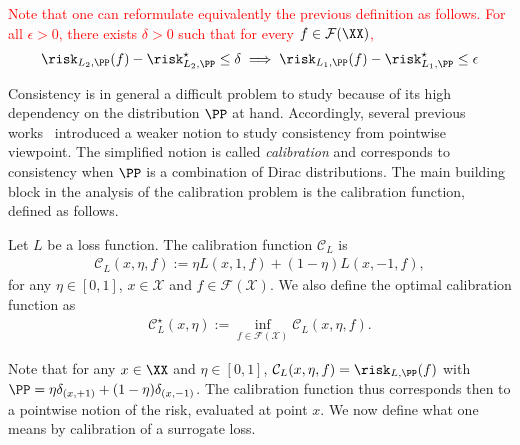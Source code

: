 \textcolor{red}{
Note that one can reformulate equivalently the previous definition as follows.  For all $\epsilon>0$, there exists $\delta>0$ such that for every $f\in\mathcal{F}(\XX)$,
\begin{align*}
    \risk_{L_2,\PP}(f)- \risk_{L_2,\PP}^\star\leq\delta\implies\risk_{L_1,\PP}(f)-\risk_{L_1,\PP}^\star\leq\epsilon
\end{align*}
}

Consistency is in general a difficult problem to study because of its high dependency on the distribution $\PP$ at hand. Accordingly, several previous works~\citep{zhang2004statistical,bartlett2002rademacher,steinwart2007compare} introduced a weaker notion to study consistency from pointwise viewpoint. The simplified notion is called \textit{calibration} and corresponds to consistency when $\PP$ is a combination of Dirac distributions. The main building block in the analysis of the calibration problem is the calibration function, defined as follows.

\begin{definition}
Let $L$ be a loss function. The calibration function $\mathcal{C}_L$ is 
\begin{align*}
    \mathcal{C}_L(x,\eta,f):=\eta L(x,1,f) +(1-\eta) L(x,-1,f),
\end{align*}
for any $\eta\in[0,1]$, $x\in\mathcal{X}$ and $f\in\mathcal{F}(\mathcal{X})$. We also define the optimal calibration function as
\begin{align*}
        \mathcal{C}^\star_L(x,\eta):=\inf_{f\in\mathcal{\mathcal{F}(\mathcal{X})}}\mathcal{C}_L(x,\eta,f).
\end{align*}

\end{definition}

Note that for any $x\in\XX$ and $\eta\in[0,1]$, $\mathcal{C}_L(x,\eta,f) =\risk_{L,\PP}(f)$ with $\PP = \eta \delta_{(x,+1)}+ (1-\eta)\delta_{(x,-1)}$. The calibration function thus corresponds then to a pointwise notion of the risk, evaluated at point $x$. We now define what one means by calibration of a surrogate loss.

